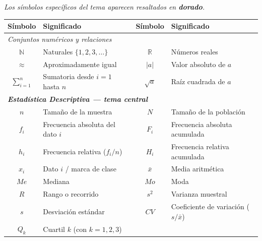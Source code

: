 \documentclass[11pt, letterpaper]{article}
\begin{document}
\begin{tcolorbox}[importantbox, title={Glosario de simbología}]
{\small\textit{Los símbolos específicos del tema aparecen resaltados en \textcolor{zenitgold}{\textbf{dorado}}.}}
\medskip
\begin{center}
\renewcommand{\arraystretch}{1.32}
\begin{tabular}{c p{4.5cm} | c p{4.5cm}}
\toprule
\textbf{Símbolo} & \textbf{Significado} & \textbf{Símbolo} & \textbf{Significado}\\
\midrule
\multicolumn{4}{l}{\textit{Conjuntos numéricos y relaciones}}\\
$\mathbb{N}$ & Naturales $\{1,2,3,\ldots\}$ &
$\mathbb{R}$ & Números reales\\
$\approx$ & Aproximadamente igual &
$|a|$ & Valor absoluto de $a$\\
$\sum_{i=1}^{n}$ & Sumatoria desde $i=1$ hasta $n$ &
$\sqrt{a}$ & Raíz cuadrada de $a$\\[4pt]
\multicolumn{4}{l}{\textit{\textcolor{zenitgold}{\textbf{Estadística Descriptiva --- tema central}}}}\\
\textcolor{zenitgold}{$n$} & \textcolor{zenitgold}{Tamaño de la muestra} &
\textcolor{zenitgold}{$N$} & \textcolor{zenitgold}{Tamaño de la población}\\
\textcolor{zenitgold}{$f_i$} & \textcolor{zenitgold}{Frecuencia absoluta del dato $i$} &
\textcolor{zenitgold}{$F_i$} & \textcolor{zenitgold}{Frecuencia absoluta acumulada}\\
\textcolor{zenitgold}{$h_i$} & \textcolor{zenitgold}{Frecuencia relativa ($f_i/n$)} &
\textcolor{zenitgold}{$H_i$} & \textcolor{zenitgold}{Frecuencia relativa acumulada}\\
\textcolor{zenitgold}{$x_i$} & \textcolor{zenitgold}{Dato $i$ / marca de clase} &
\textcolor{zenitgold}{$\bar{x}$} & \textcolor{zenitgold}{Media aritmética}\\
\textcolor{zenitgold}{$Me$} & \textcolor{zenitgold}{Mediana} &
\textcolor{zenitgold}{$Mo$} & \textcolor{zenitgold}{Moda}\\
\textcolor{zenitgold}{$R$} & \textcolor{zenitgold}{Rango o recorrido} &
\textcolor{zenitgold}{$s^2$} & \textcolor{zenitgold}{Varianza muestral}\\
\textcolor{zenitgold}{$s$} & \textcolor{zenitgold}{Desviación estándar} &
\textcolor{zenitgold}{$CV$} & \textcolor{zenitgold}{Coeficiente de variación ($s/\bar{x}$)}\\
\textcolor{zenitgold}{$Q_k$} & \textcolor{zenitgold}{Cuartil $k$ (con $k=1,2,3$)} &

\end{tabular}
\end{center}
\end{tcolorbox}
\end{document}

